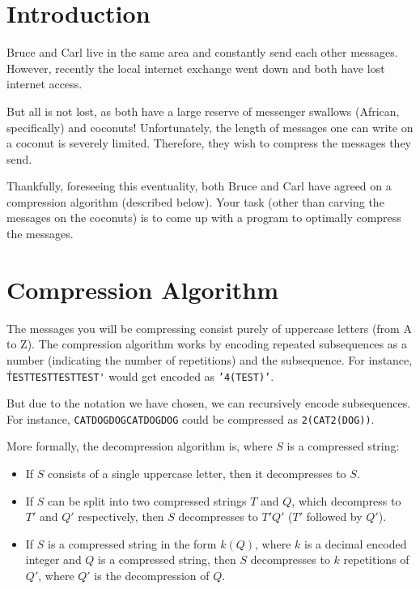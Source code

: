 \documentclass{saco}
\begin{document}
\maketitle

\section{Introduction}
Bruce and Carl live in the same area and constantly send each other messages.
However, recently the local internet exchange went down and both have lost
internet access.

But all is not lost, as both have a large reserve of messenger swallows
(African, specifically) and coconuts! Unfortunately, the length of messages one
can write on a coconut is severely limited. Therefore, they wish to compress
the messages they send.

Thankfully, foreseeing this eventuality, both Bruce and Carl have agreed on a
compression algorithm (described below). Your task (other than carving the
messages on the coconuts) is to come up with a program to
optimally compress the messages.

\section{Compression Algorithm}
The messages you will be compressing consist purely of uppercase letters (from
A to Z). The compression algorithm works by encoding repeated subsequences as a
number (indicating the number of repetitions) and the subsequence. For instance,
\texttt{\'TESTTESTTESTTEST\'} would get encoded as \texttt{'4(TEST)'}.

But due to the notation we have chosen, we can recursively encode subsequences.
For instance, \texttt{CATDOGDOGCATDOGDOG} could be compressed as
\texttt{2(CAT2(DOG))}.

More formally, the decompression algorithm is, where $S$ is a compressed string:
\begin{itemize}
  \item If $S$ consists of a single uppercase letter, then it decompresses to
        $S$.
  \item If $S$ can be split into two compressed strings $T$ and $Q$, which
        decompress to $T'$ and $Q'$ respectively, then $S$ decompresses to
        $T'Q'$ ($T'$ followed by $Q'$).
  \item If $S$ is a compressed string in the form $k(Q)$, where $k$ is a
        decimal encoded integer and $Q$ is a compressed string, then $S$
        decompresses to $k$ repetitions of $Q'$, where $Q'$ is the
        decompression of $Q$.
\end{itemize}
\end{document}
